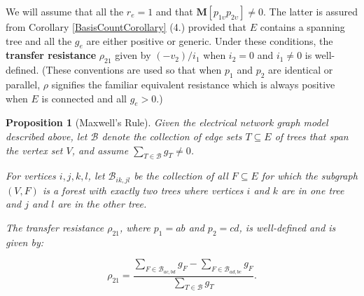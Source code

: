 \documentclass[12pt]{article}
\newtheorem{proposition}[theorem]{Proposition}
\theoremstyle{definition}
\newcommand{\Vs}{\ensuremath{\upsilon}}
\newcommand{\ext}[1]{\ensuremath{\mathbf{#1}}}
\begin{document}
We will assume that all the $r_e=1$ and 
that $\ext{M}[p_{1\Vs}p_{2\Vs}]\neq 0$.
The latter is assured from Corollary \ref{BasisCountCorollary} (4.) 
provided that $E$ contains
a spanning tree and all the $g_e$ are either positive or generic.  Under
these conditions, the \textbf{transfer resistance} $\rho_{21}$ given
by $(-v_2)/i_1$ when $i_2=0$ and $i_1\neq 0$ is well-defined.  (These 
conventions are used so that 
when $p_1$ and $p_2$ are identical or parallel,
$\rho$ signifies the familiar equivalent resistance which is always positive
when $E$ is connected and all $g_e>0$.)

\begin{proposition}[Maxwell's Rule]
\label{Maxwell1}
Given the electrical network graph model described above, let
$\mathcal{B}$ denote the collection of edge sets 
$T\subseteq E$ of trees that span the vertex set $V$, and assume 
$\sum_{T\in \mathcal{B}}g_T\neq 0$.

For vertices $i,j,k,l$, 
let $\mathcal{B}_{ik,jl}$ be the collection 
of all $F\subseteq E$
for which
the subgraph $(V,F)$ is a forest
with exactly two trees where vertices
$i$ and $k$ are in one tree and 
$j$ and $l$ are in the other tree.

The transfer resistance $\rho_{21}$, where $p_1=ab$ and 
$p_2=cd$, is well-defined and is given by:

\begin{equation}
\label{Maxwell1equation2port}
\rho_{21}=\frac{\sum_{F\in \mathcal{B}_{ac,bd}}g_F -
                  \sum_{F\in \mathcal{B}_{ad,bc}}g_F}
                 {\sum_{T\in \mathcal{B}}g_T}.
\end{equation}
\end{proposition}
\end{document}
